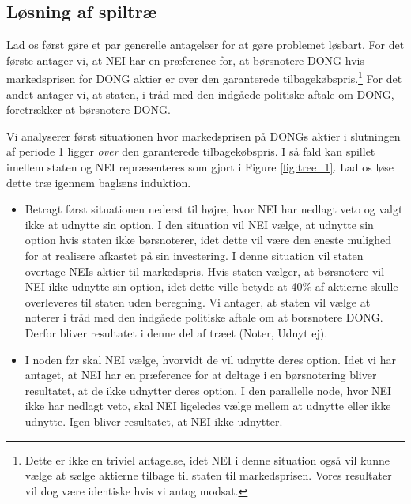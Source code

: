 \documentclass{article}
\begin{document}
\begin{appendices}
\renewcommand\appendixname{Appendix}

\section{Løsning af spiltræ}
\label{sec:app_tree}
Lad os først gøre et par generelle antagelser for at gøre problemet løsbart. For det første antager vi, at NEI har en præference for, at børsnotere DONG hvis markedsprisen for DONG aktier er over den garanterede tilbagekøbspris.\footnote{Dette er ikke en triviel antagelse, idet NEI i denne situation også vil kunne vælge at sælge aktierne tilbage til staten til markedsprisen. Vores resultater vil dog være identiske hvis vi antog modsat.} For det andet antager vi, at staten, i tråd med den indgåede politiske aftale om DONG, foretrækker at børsnotere DONG. %

Vi analyserer først situationen hvor markedsprisen på DONGs aktier i slutningen af periode 1 ligger \textit{over} den garanterede tilbagekøbspris. I så fald kan spillet imellem staten og NEI repræsenteres som gjort i Figure \ref{fig:tree_1}. Lad os løse dette træ igennem baglæns induktion.  

\begin{itemize}

	\item Betragt først situationen nederst til højre, hvor NEI har nedlagt veto og valgt ikke at udnytte sin option. I den situation vil NEI vælge, at udnytte sin option hvis staten ikke børsnoterer, idet dette vil være den eneste mulighed for at realisere afkastet på sin investering. I denne situation vil staten overtage NEIs aktier til markedspris. Hvis staten vælger, at børsnotere vil NEI ikke udnytte sin option, idet dette ville betyde at 40\% af aktierne skulle overleveres til staten uden beregning. Vi antager, at staten vil vælge at noterer i tråd med den indgåede politiske aftale om at borsnotere DONG. Derfor bliver resultatet i denne del af træet (Noter, Udnyt ej).

	\item I noden før skal NEI vælge, hvorvidt de vil udnytte deres option. Idet vi har antaget, at NEI har en præference for at deltage i en børsnotering bliver resultatet, at de ikke udnytter deres option. I den parallelle node, hvor NEI ikke har nedlagt veto, skal NEI ligeledes vælge mellem at udnytte eller ikke udnytte. Igen bliver resultatet, at NEI ikke udnytter.
	

\end{itemize}
\end{appendices}
\end{document}
